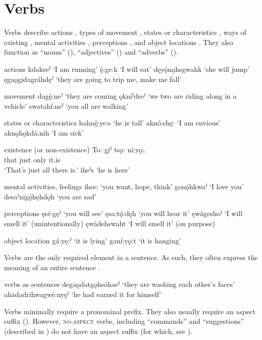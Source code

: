 \chapter{Verbs} \label{Verbs}
Verbs describe actions , types of movement , states or characteristics , ways of existing , mental activities , perceptions , and object locations . They also function as “nouns” (), “adjectives” () and “adverbs” ().

\ea\label{ex:verbex} actions
\ea kdakseˀ ‘I am running’
\ex ę́:ge:k ‘I will eat’
\ex dęyǫ́na̱hsgwahk ‘she will jump’
\ex ęgaǫgidagráhdęˀ ‘they are going to trip me, make me fall’
\z
\z

\ea\label{ex:verbex2} movement
\ea dagę́:neˀ ‘they are coming
\ex ǫkníˀdreˀ ‘we two are riding along in a vehicle’
\ex swatahí:neˀ ‘you all are walking’
\z
\z

\ea\label{ex:verbex3} states or characteristics
\ea hahnę́:ye:s ‘he is tall’
\ex aknó:shę: ‘I am envious’
\ex aknǫhǫkdá:nih ‘I am sick’
\z
\z

\ea\label{ex:verbex4} existence (or non-existence)
\ea 
\gll To: gi̱ˀ tsǫ: ní:yǫ:.\\
that just only it.is\\
\glt ‘That’s just all there is.’
\ex iheˀs ‘he is here’
\z
\z

\ea\label{ex:verbex5} mental activities, feelings
\ea ihse: ‘you want, hope, think’
\ex gonǫ́hkwaˀ ‘I love you’
\ex desaˀnigǫ́hęhdǫh ‘you are sad’
\z
\z

\ea\label{ex:verbex6} perceptions
\ea ęsé:gęˀ ‘you will see’
\ex ęsa:tǫ́:dęh ‘you will hear it’
\ex ęwágeshoˀ ‘I will smell it’ (unintentionally)
\ex ęwádehswaht ‘I will smell it’ (on purpose)
\z
\z

\ea\label{ex:verbex7} object location
\ea gá:yę:ˀ ‘it is lying’
\ex ganí:yǫ:t ‘it is hanging’
\z
\z

Verbs are the only required element in a sentence. As such, they often express the meaning of an entire sentence .

\ea\label{ex:verbex8} verbs as sentences
\ea degaǫdatgǫhsóhaeˀ ‘they are washing each other’s faces’
\ex ahadadrihwagwé:nyęˀ ‘he had earned it for himself’
\z
\z

Verbs minimally require a pronominal prefix. They also usually require an aspect suffix (\cite{chafe_seneca_1967}). However, \textsc{no-aspect} verbs, including “commands” and “suggestions” (described in ) do not have an aspect suffix (for which, see ).

